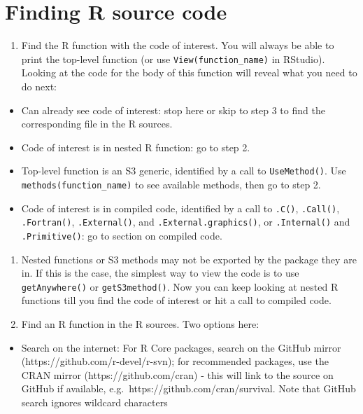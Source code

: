 \documentclass[
  letterpaper,
  DIV=11,
  numbers=noendperiod]{scrreprt}
\providecommand{\tightlist}{%
  \setlength{\itemsep}{0pt}\setlength{\parskip}{0pt}}\usepackage{longtable,booktabs,array}
\begin{document}
\section{Finding R source code}\label{finding-r-source-code}

\begin{enumerate}
\def\labelenumi{\arabic{enumi}.}
\tightlist
\item
  Find the R function with the code of interest. You will always be able
  to print the top-level function (or use \texttt{View(function\_name)}
  in RStudio). Looking at the code for the body of this function will
  reveal what you need to do next:
\end{enumerate}

\begin{itemize}
\item
  Can already see code of interest: stop here or skip to step 3 to find
  the corresponding file in the R sources.
\item
  Code of interest is in nested R function: go to step 2.
\item
  Top-level function is an S3 generic, identified by a call to
  \texttt{UseMethod()}. Use \texttt{methods(function\_name)} to see
  available methods, then go to step 2.
\item
  Code of interest is in compiled code, identified by a call to
  \texttt{.C()}, \texttt{.Call()}, \texttt{.Fortran()},
  \texttt{.External()}, and \texttt{.External.graphics()}, or
  \texttt{.Internal()} and \texttt{.Primitive()}: go to section on
  compiled code.
\end{itemize}

\begin{enumerate}
\def\labelenumi{\arabic{enumi}.}
\setcounter{enumi}{1}
\item
  Nested functions or S3 methods may not be exported by the package they
  are in. If this is the case, the simplest way to view the code is to
  use \texttt{getAnywhere()} or \texttt{getS3method()}. Now you can keep
  looking at nested R functions till you find the code of interest or
  hit a call to compiled code.
\item
  Find an R function in the R sources. Two options here:
\end{enumerate}

\begin{itemize}
\tightlist
\item
  Search on the internet: For R Core packages, search on the GitHub
  mirror (https://github.com/r-devel/r-svn); for recommended packages,
  use the CRAN mirror (https://github.com/cran) - this will link to the
  source on GitHub if available, e.g.~https://github.com/cran/survival.
  Note that GitHub search ignores wildcard characters
\end{itemize}
\end{document}
